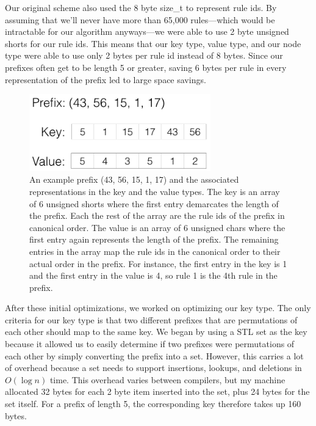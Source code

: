 Our original scheme also used the 8 byte size\_t to represent rule ids.
By assuming that we'll never have more than 65,000 rules---which would be intractable for our algorithm anyways---we were able to use 2 byte unsigned shorts for our rule ids.
This means that our key type, value type, and our node type were able to use only 2 bytes per rule id instead of 8 bytes.
Since our prefixes often get to be length 5 or greater, saving 6 bytes per rule in every representation of the prefix led to large space savings.

\begin{figure}[t!]
\begin{center}
\includegraphics[width=0.7\textwidth]{figs/pmap_types.png}
\end{center}
\caption{An example prefix (43, 56, 15, 1, 17) and the associated representations in the key and the value types.
The key is an array of 6 unsigned shorts where the first entry demarcates the length of the prefix.
Each the rest of the array are the rule ids of the prefix in canonical order.
The value is an array of 6 unsigned chars where the first entry again represents the length of the prefix.
The remaining entries in the array map the rule ids in the canonical order to their actual order in the prefix.
For instance, the first entry in the key is 1 and the first entry in the value is 4, so rule 1 is the 4th rule in the prefix.}
\label{fig:pmap-types}
\end{figure}

After these initial optimizations, we worked on optimizing our key type.
The only criteria for our key type is that two different prefixes that are permutations of each other should map to the same key.
We began by using a STL set as the key because it allowed us to easily determine if two prefixes were permutations of each other by simply converting the prefix into a set.
However, this carries a lot of overhead because a set needs to support insertions, lookups, and deletions in $O(\log n)$ time.
This overhead varies between compilers, but my machine allocated 32 bytes for each 2 byte item inserted into the set, plus 24 bytes for the set itself.
For a prefix of length 5, the corresponding key therefore takes up 160 bytes.

